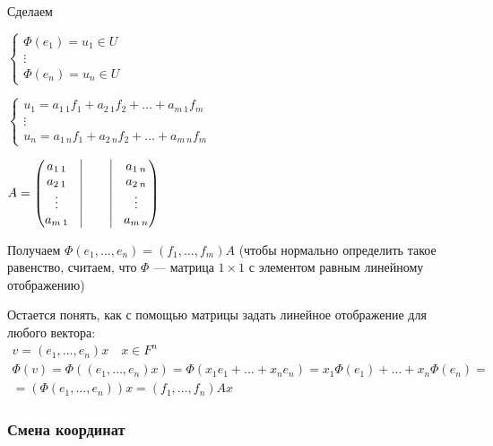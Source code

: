 \bigskip

Сделаем

\(
    \begin{cases}
        \Phi(e_1) = u_1 \in U
        \\
        \vdots
        \\
        \Phi(e_n) = u_n \in U
    \end{cases}
\)

\bigskip

\(
    \begin{cases}
        u_1 = a_{1 \: 1} f_1 + a_{2 \: 1} f_2 + \ldots + a_{m \: 1} f_m
        \\
        \vdots
        \\
        u_n = a_{1 \: n} f_1 + a_{2 \: n} f_2 + \ldots + a_{m \: n} f_m
    \end{cases}
\)

\bigskip

\(
    A
    =
    \begin{pmatrix}
        a_{1 \: 1} & \vline & \ & \vline & a_{1 \: n}
        \\
        a_{2 \: 1} & \vline & \ & \vline & a_{2 \: n}
        \\
        \vdots & \vline & \ & \vline & \vdots
        \\
        a_{m \: 1} & \vline & \ & \vline & a_{m \: n}
    \end{pmatrix}
\)

\bigskip

Получаем \( \Phi (e_1, \ldots, e_n) = (f_1, \ldots, f_m) A \)
(чтобы нормально определить такое равенство, считаем, что
\( \Phi \) --- матрица \( 1 \times 1 \) с элементом равным линейному отображению)

Остается понять, как с помощью матрицы задать линейное отображение для любого вектора:
\begin{gather*}
    v = (e_1, \ldots, e_n) x \quad x \in F^n
    \\
    \Phi(v) = \Phi( (e_1, \ldots, e_n) x )
    =
    \Phi ( x_1 e_1 + \ldots + x_n e_n ) = x_1 \Phi (e_1) + \ldots + x_n \Phi (e_n)
    =
    \\
    =
    ( \Phi (e_1, \ldots, e_n) ) x = ( f_1, \ldots, f_n ) Ax
\end{gather*}

\subsubsection{Смена координат}

